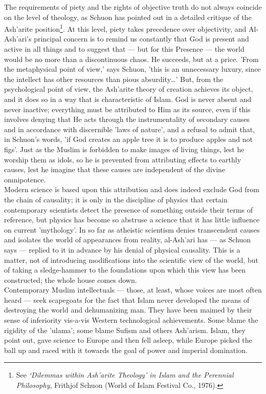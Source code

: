 \documentclass[10pt, twoside,openright]{book}
\begin{document}
The requirements of piety and the rights of objective truth do not always coincide on the level of 
theology, as Schuon has pointed out in a detailed critique of the Ash'arite position\footnote{See \emph{`Dilemmas within Ash'arite Theology' in Islam and the Perennial Philosophy}, Frithjof Schuon 
(World of Islam Festival Co., 1976).}. At this 
level, piety takes precedence over objectivity, and Al\hyp{}Ash'ari's principal concern is to remind us 
constantly that God is present and active in all things and to suggest that --- but for this Presence --- 
the world would be no more than a discontinuous chaos. He succeeds, but at a price. 'From the 
metaphysical point of view,' says Schuon, 'this is an unnecessary luxury, since the intellect has 
other resources than pious absurdity\ldots{}' But, from the psychological point of view, the Ash'arite 
theory of creation achieves its object, and it does so in a way that is characteristic of Islam. God 
is never absent and never inactive; everything must be attributed to Him as its source, even if this 
involves denying that He acts through the instrumentality of secondary causes and in accordance with 
discernible 'laws of nature', and a refusal to admit that, in Schuon's words, 'if God creates an 
apple tree it is to produce apples and not figs'. Just as the Muslim is forbidden to make images of 
living things, lest he worship them as idols, so he is prevented from attributing effects to earthly 
causes, lest he imagine that these causes are independent of the divine omnipotence. \\

Modern science is based upon this attribution and does indeed exclude God from the chain of 
causality; it is only in the discipline of physics that certain contemporary scientists detect the 
presence of something outside their terms of reference, but physics has become so abstruse a science 
that it has little influence on current 'mythology'. In so far as atheistic scientism denies 
transcendent causes and isolates the world of appearances from reality, al-Ash'ari has --- as Schuon 
says --- replied to it in advance by his denial of physical causality. This is a matter, not of 
introducing modifications into the scientific view of the world, but of taking a sledge\hyp{}hammer to the 
foundations upon which this view has been constructed; the whole house comes down. \\

Contemporary Muslim intellectuals --- those, at least, whose voices are most often heard --- seek 
scapegoats for the fact that Islam never developed the means of destroying the world and dehumanizing 
man. They have been maimed by their sense of inferiority vis\hyp{}a\hyp{}vis Western technological 
achievements. Some blame the rigidity of the 'ulama'; some blame Sufism and others Ash'arism. Islam, 
they point out, gave science to Europe and then fell asleep, while Europe picked the ball up and 
raced with it towards the goal of power and imperial domination. \\
\end{document}
